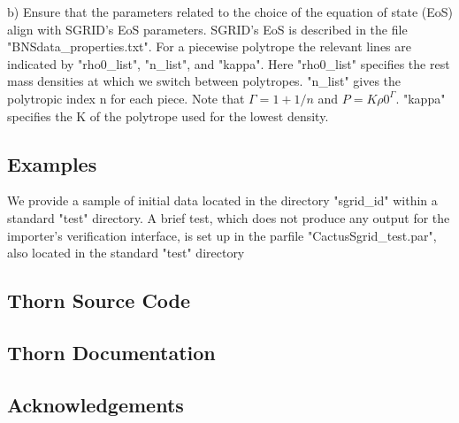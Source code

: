 b) Ensure that the parameters related to the choice of the equation of state
(EoS) align with SGRID's EoS parameters. SGRID's EoS is described in the
file "BNSdata\_properties.txt". For a piecewise polytrope the relevant lines
are indicated by "rho0\_list", "n\_list", and "kappa". Here "rho0\_list"
specifies the rest mass densities at which we switch between polytropes.
"n\_list" gives the polytropic index n for each piece. Note that
   $\Gamma = 1 + 1/n$    and    $P = K \rho0^\Gamma$.
"kappa" specifies the K of the polytrope used for the lowest density.

\subsection{Examples}

We provide a sample of initial data located in the directory "sgrid\_id" within a standard "test" directory. A brief test, which does not produce any output for the importer's verification interface, is set up in the parfile "CactusSgrid\_test.par", also located in the standard "test" directory



\subsection{Thorn Source Code}

\subsection{Thorn Documentation}

\subsection{Acknowledgements}


\begin{thebibliography}{9}

\end{thebibliography}



